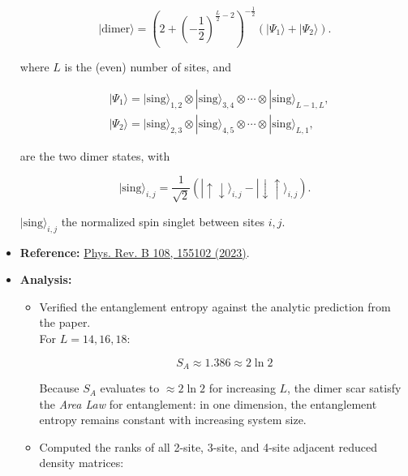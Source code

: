 \documentclass[11pt]{article}
\begin{document}
\begin{itemize}
    \begin{equation}
    | \text{dimer} \rangle = \left( 2 + \left( -\frac{1}{2} \right)^{\frac{L}{2} - 2} \right)^{-\frac{1}{2}} \left( |\Psi_1\rangle + |\Psi_2\rangle \right).
    \end{equation}

    where $L$ is the (even) number of sites, and
    
    \begin{align}
    &|\Psi_1\rangle = | \text{sing} \rangle_{1,2} \otimes | \text{sing} \rangle_{3,4} \otimes \cdots \otimes | \text{sing} \rangle_{L-1,L}, \\
    &|\Psi_2\rangle = | \text{sing} \rangle_{2,3} \otimes | \text{sing} \rangle_{4,5} \otimes \cdots \otimes | \text{sing} \rangle_{L,1},
    \end{align}
    
    are the two dimer states, with
    
    \begin{equation}
    | \text{sing} \rangle_{i,j} = \frac{1}{\sqrt{2}} \left( | \uparrow \downarrow \rangle_{i,j} - | \downarrow \uparrow \rangle_{i,j} \right).
    \end{equation}
    
    $| \text{sing} \rangle_{i,j}$ the normalized spin singlet between sites $i,j$.
       
    \item \textbf{Reference:} \href{https://journals.aps.org/prb/abstract/10.1103/PhysRevB.108.155102}{Phys. Rev. B 108, 155102 (2023)}.
    \item \textbf{Analysis:}
    \begin{itemize}
        \item Verified the entanglement entropy against the analytic prediction from the paper.\\ For $L=14,16,18$:
        
        \begin{equation}
        S_A \approx 1.386 \approx 2 \ln 2
        \end{equation}
        
        Because $S_A$ evaluates to $\approx 2 \ln 2$ for increasing $L$, the dimer scar satisfy the \textit{Area Law} for entanglement: in one dimension, the entanglement entropy remains constant with increasing system size.
        
        \item Computed the ranks of all 2-site, 3-site, and 4-site adjacent reduced density matrices:
        

\end{itemize}
\end{itemize}
\end{document}
